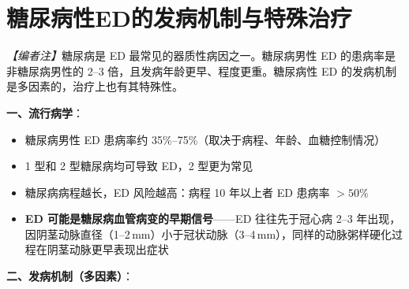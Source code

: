 \section{糖尿病性ED的发病机制与特殊治疗}
\label{sec:diabetic_ed}

\noindent\textit{【编者注】}糖尿病是 ED 最常见的器质性病因之一。糖尿病男性 ED 的患病率是非糖尿病男性的 2--3 倍，且发病年龄更早、程度更重。糖尿病性 ED 的发病机制是多因素的，治疗上也有其特殊性。

\vspace{0.5em}
\noindent\textbf{一、流行病学}：

\begin{itemize}[leftmargin=2cm]
	\item 糖尿病男性 ED 患病率约 35\%--75\%（取决于病程、年龄、血糖控制情况）
	\item 1 型和 2 型糖尿病均可导致 ED，2 型更为常见
	\item 糖尿病病程越长，ED 风险越高：病程 10 年以上者 ED 患病率 $>50\%$
	\item \textbf{ED 可能是糖尿病血管病变的早期信号}——ED 往往先于冠心病 2--3 年出现，因阴茎动脉直径（1--2\,mm）小于冠状动脉（3--4\,mm），同样的动脉粥样硬化过程在阴茎动脉更早表现出症状
\end{itemize}

\vspace{0.5em}
\noindent\textbf{二、发病机制（多因素）}：

